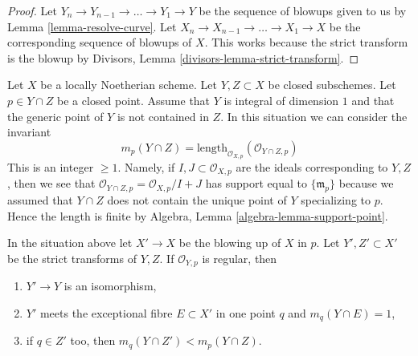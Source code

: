 \begin{proof}
Let $Y_n \to Y_{n - 1} \to \ldots \to Y_1 \to Y$ be the sequence of
blowups given to us by Lemma \ref{lemma-resolve-curve}. Let
$X_n \to X_{n - 1} \to \ldots \to X_1 \to X$ be the corresponding
sequence of blowups of $X$. This works because the strict transform
is the blowup by Divisors, Lemma \ref{divisors-lemma-strict-transform}.
\end{proof}

\noindent
Let $X$ be a locally Noetherian scheme. Let $Y, Z \subset X$ be
closed subschemes. Let $p \in Y \cap Z$ be a closed point. Assume
that $Y$ is integral of dimension $1$ and that the generic point of $Y$
is not contained in $Z$. In this situation we can
consider the invariant
\begin{equation}
\label{equation-multiplicity}
m_p(Y \cap Z) =
\text{length}_{\mathcal{O}_{X, p}}(\mathcal{O}_{Y \cap Z, p})
\end{equation}
This is an integer $\geq 1$. Namely, if $I, J \subset \mathcal{O}_{X, p}$
are the ideals corresponding to $Y, Z$, then we see that
$\mathcal{O}_{Y \cap Z, p} = \mathcal{O}_{X, p}/I + J$
has support equal to $\{\mathfrak m_p\}$ because we assumed that
$Y \cap Z$ does not contain the unique point of $Y$ specializing to $p$.
Hence the length is finite by
Algebra, Lemma \ref{algebra-lemma-support-point}.

\begin{lemma}
\label{lemma-blowup-nonsingular-curves-meeting-at-point}
In the situation above let $X' \to X$ be the blowing up of $X$ in $p$.
Let $Y', Z' \subset X'$ be the strict transforms of $Y, Z$.
If $\mathcal{O}_{Y, p}$ is regular, then
\begin{enumerate}
\item $Y' \to Y$ is an isomorphism,
\item $Y'$ meets the exceptional fibre $E \subset X'$ in one point
$q$ and $m_q(Y \cap E) = 1$,
\item if $q \in Z'$ too, then $m_q(Y \cap Z') < m_p(Y \cap Z)$.
\end{enumerate}
\end{lemma}

